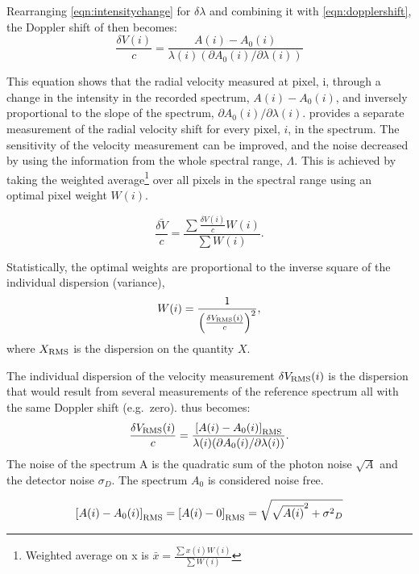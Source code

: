 Rearranging \cref{eqn:intensitychange} for \(\delta \lambda\) and combining it with \cref{eqn:dopplershift}, the Doppler shift of then becomes:
\begin{equation}
    \frac{\delta V(i)}{c} = \frac{A(i) - A_0(i) }{\lambda(i) (\partial A_0(i)/\partial \lambda(i))} \label{eqn:delta_v_i}
\end{equation}

This equation shows that the radial velocity measured at pixel, i, through a change in the intensity in the recorded spectrum, \(A(i)-A_0(i)\), and inversely proportional to the slope of the spectrum, \({\partial A_0(i)}/{\partial \lambda(i)}\).
 provides a separate measurement of the radial velocity shift for every pixel, $i$, in the spectrum.
The sensitivity of the velocity measurement can be improved, and the noise decreased by using the information from the whole spectral range, \(\Lambda\).
This is achieved by taking the weighted average\footnote{Weighted average on x is \(\bar{x} = \frac{\sum{ x(i)W(i)}}{\sum {W(i)}}\)} over all pixels in the spectral range using an optimal pixel weight \(W(i)\).

\begin{equation}
\bar{\frac{\delta V}{c}} = \frac{\sum{\frac{\delta V(i)}{c}W(i)}}{\sum {W(i)}}.
\end{equation}

Statistically, the optimal weights are proportional to the inverse square of the individual dispersion (variance),
\begin{equation}
W(i) = \frac{1}{{\left(\frac{\delta V_{\textrm{RMS}}(i)}{c}\right)}^{2}}, \label{eqn:weights}
\end{equation}
where \(X_{\textrm{RMS}}\) is the dispersion on the quantity \(X\).

The individual dispersion of the velocity measurement \(\delta V_{\textrm{RMS}}(i)\) is the dispersion that would result from several measurements of the reference spectrum all with the same Doppler shift (e.g.\ zero).
 thus becomes:
\begin{equation}
    \frac{\delta V_{\textrm{RMS}}(i)}{c} = \frac{{[A(i) - A_0(i)]}_{\textrm{RMS}} }{\lambda(i) (\partial A_0(i)/\partial \lambda(i))}.
    \label{eqn:delta_v_i_rms}
\end{equation}
The noise of the spectrum A is the quadratic sum of the photon noise \(\sqrt{A}\) and the detector noise \(\sigma_D\).
The spectrum \(A_0\) is considered noise free.

\begin{equation}
{[{A(i)-A_0(i)}]}_{\textrm{RMS}} = {[{A(i)} - 0]}_{\textrm{RMS}} = \sqrt{{\sqrt{A(i)}}^{2} + {{\sigma}^{2}}_{D}} \label{eqn:noise}
\end{equation}

